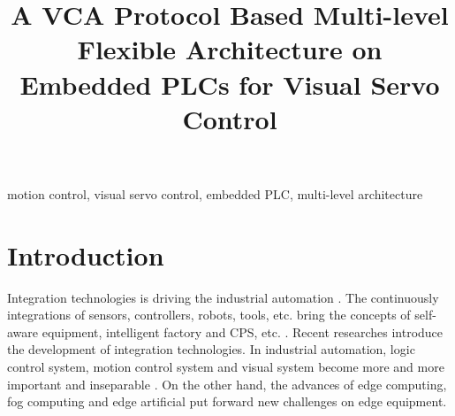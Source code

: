 \documentclass[journal,UTF8]{IEEEtran}
\begin{document}
%
\title{A VCA Protocol Based Multi-level Flexible Architecture on Embedded PLCs for Visual Servo Control }

\maketitle


\begin{abstract}

\end{abstract}

\begin{IEEEkeywords}
motion control, visual servo control, embedded PLC, multi-level architecture
\end{IEEEkeywords}

%
\IEEEpeerreviewmaketitle



\section{Introduction}
Integration technologies is driving the industrial automation \cite{Kazmierkowski2007Integration}. The continuously integrations of sensors, controllers, robots, tools, etc. bring the concepts of self-aware equipment, intelligent factory and CPS, etc. \cite{Wan2018An,Chekired2018Industrial}.  Recent researches \cite{Colombo2006An,Vaccaro2010An,Dean2017Integration} introduce the development of integration technologies. In industrial automation, logic control system,  motion control system and visual system become more and more important and inseparable \cite{Feng2002Integrating,Chang2006Motion,Feng2005Practical}. On the other hand, the advances of edge computing, fog computing and edge artificial\cite{Hu2017Fog,Hou2018Green,PaceAn} put forward new challenges on edge equipment.
\end{document}
